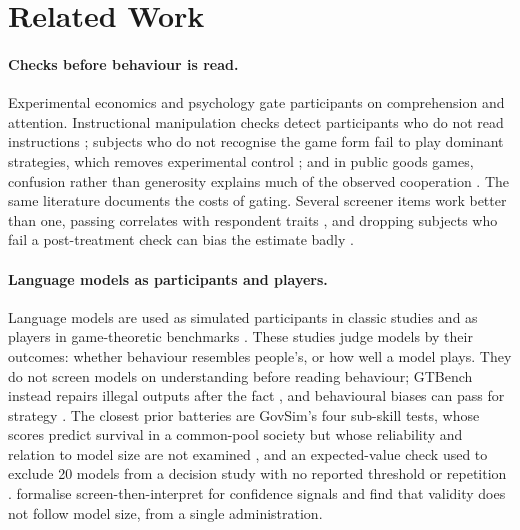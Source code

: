 \documentclass[11pt]{article}
\begin{document}
\section{Related Work}
\label{sec:related}

\paragraph{Checks before behaviour is read.}
Experimental economics and psychology gate participants on comprehension and
attention. Instructional manipulation checks detect participants who do not
read instructions \citep{oppenheimer2009instructional}; subjects who do not
recognise the game form fail to play dominant strategies, which removes
experimental control \citep{chou2009control}; and in public goods games,
confusion rather than generosity explains much of the observed cooperation
\citep{burtonchellew2016conditional}. The same literature documents the costs
of gating. Several screener items work better than one, passing correlates
with respondent traits \citep{berinsky2014separating}, and dropping subjects
who fail a post-treatment check can bias the estimate badly
\citep{aronow2019note}.

\paragraph{Language models as participants and players.}
Language models are used as simulated participants in classic studies
\citep{aher2023using,argyle2023out,filippas2024large,dillion2023can} and as
players in game-theoretic benchmarks
\citep{akata2025playing,duan2024gtbench,huang2025competing,fan2024can,lore2024strategic}.
These studies judge models by their outcomes: whether behaviour resembles
people's, or how well a model plays. They do not screen models on
understanding before reading behaviour; GTBench instead repairs illegal
outputs after the fact \citep{duan2024gtbench}, and behavioural biases can pass
for strategy \citep{herr2024are}. The closest prior batteries are GovSim's four
sub-skill tests, whose scores predict survival in a common-pool society but
whose reliability and relation to model size are not examined
\citep{piatti2024cooperate}, and an expected-value check used to exclude 20
models from a decision study with no reported threshold or repetition
\citep{huang2026probing}. \citet{cacioli2026screen} formalise
screen-then-interpret for confidence signals and find that validity does not
follow model size, from a single administration.
\end{document}
